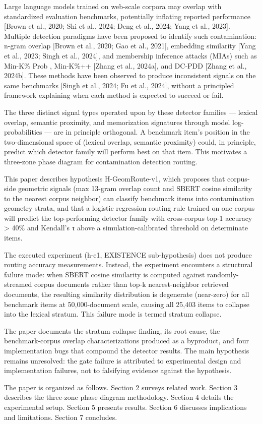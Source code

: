 
Large language models trained on web-scale corpora may overlap with standardized evaluation benchmarks, potentially inflating reported performance [Brown et al., 2020; Shi et al., 2024; Deng et al., 2024; Yang et al., 2023]. Multiple detection paradigms have been proposed to identify such contamination: n-gram overlap [Brown et al., 2020; Gao et al., 2021], embedding similarity [Yang et al., 2023; Singh et al., 2024], and membership inference attacks (MIAs) such as Min-K\% Prob \citep{Shietal2024}, Min-K\%++ [Zhang et al., 2024a], and DC-PDD [Zhang et al., 2024b]. These methods have been observed to produce inconsistent signals on the same benchmarks [Singh et al., 2024; Fu et al., 2024], without a principled framework explaining when each method is expected to succeed or fail.

The three distinct signal types operated upon by these detector families — lexical overlap, semantic proximity, and memorization signatures through model log-probabilities — are in principle orthogonal. A benchmark item's position in the two-dimensional space of (lexical overlap, semantic proximity) could, in principle, predict which detector family will perform best on that item. This motivates a three-zone phase diagram for contamination detection routing.

This paper describes hypothesis H-GeomRoute-v1, which proposes that corpus-side geometric signals (max 13-gram overlap count and SBERT cosine similarity to the nearest corpus neighbor) can classify benchmark items into contamination geometry strata, and that a logistic regression routing rule trained on one corpus will predict the top-performing detector family with cross-corpus top-1 accuracy > 40\% and Kendall's τ above a simulation-calibrated threshold on determinate items.

The executed experiment (h-e1, EXISTENCE sub-hypothesis) does not produce routing accuracy measurements. Instead, the experiment encounters a structural failure mode: when SBERT cosine similarity is computed against randomly-streamed corpus documents rather than top-k nearest-neighbor retrieved documents, the resulting similarity distribution is degenerate (near-zero) for all benchmark items at 50,000-document scale, causing all 25,403 items to collapse into the lexical stratum. This failure mode is termed stratum collapse.

The paper documents the stratum collapse finding, its root cause, the benchmark-corpus overlap characterizations produced as a byproduct, and four implementation bugs that compound the detector results. The main hypothesis remains unresolved: the gate failure is attributed to experimental design and implementation failures, not to falsifying evidence against the hypothesis.

The paper is organized as follows. Section 2 surveys related work. Section 3 describes the three-zone phase diagram methodology. Section 4 details the experimental setup. Section 5 presents results. Section 6 discusses implications and limitations. Section 7 concludes.

